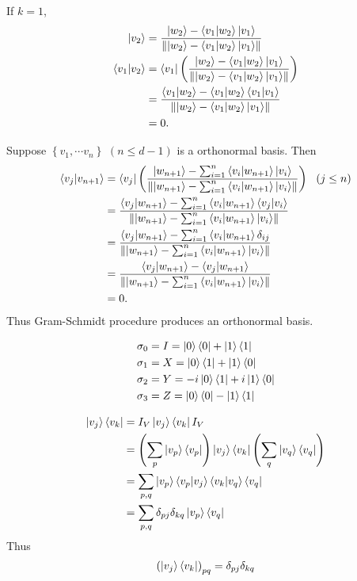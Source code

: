 
If $k = 1$,
\begin{align*}
	\ket{v_2} &= \frac{\ket{w_2} - \braket{v_1 | w_2}\ket{v_1}}{\left\lVert\ket{w_2} - \braket{v_1 | w_2}\ket{v_1}\right\rVert}\\
	\braket{v_1 | v_2} &= \bra{v_1} \left(\frac{\ket{w_2} - \braket{v_1 | w_2}\ket{v_1}}{\left\lVert\ket{w_2} - \braket{v_1 | w_2}\ket{v_1}\right\rVert}\right)\\
		&= \frac{\braket{v_1 | w_2} - \braket{v_1 | w_2}\braket{v_1 | v_1}}{\left\lVert\ket{w_2} - \braket{v_1 | w_2}\ket{v_1}\right\rVert}\\
		&= 0.
\end{align*}

Suppose $\left\{v_1, \cdots v_n \right\}$ $(n \leq d-1)$ is a orthonormal basis. Then
\begin{align*}
	\braket{v_j | v_{n+1}} &= \bra{v_j} \left(\frac{\ket{w_{n+1}} - \sum_{i=1}^{n}\braket{v_i | w_{n+1}}\ket{v_i}}{\left\lVert\ket{w_{n+1}} - \sum_{i=1}^{n}\braket{v_i | w_{n+1}}\ket{v_i}\right\rVert}\right)~~(j \leq n)\\
	&= \frac{\braket{v_j | w_{n+1}} - \sum_{i=1}^{n}\braket{v_i | w_{n+1}}\braket{v_j | v_i}}{\left\lVert\ket{w_{n+1}} - \sum_{i=1}^{n}\braket{v_i | w_{n+1}}\ket{v_i}\right\rVert}\\
	&= \frac{\braket{v_j | w_{n+1}} - \sum_{i=1}^{n}\braket{v_i | w_{n+1}}\delta_{ij}}{\left\lVert\ket{w_{n+1}} - \sum_{i=1}^{n}\braket{v_i | w_{n+1}}\ket{v_i}\right\rVert}\\
	&= \frac{\braket{v_j | w_{n+1}} - \braket{v_j | w_{n+1}}}{\left\lVert\ket{w_{n+1}} - \sum_{i=1}^{n}\braket{v_i | w_{n+1}}\ket{v_i}\right\rVert}\\
	&= 0.
\end{align*}
Thus Gram-Schmidt procedure produces an orthonormal basis.


\begin{align*}
	\sigma_0 &= I = \ket{0}\bra{0} + \ket{1}\bra{1}\\
	\sigma_1 &= X = \ket{0}\bra{1} + \ket{1}\bra{0}\\
	\sigma_2 &= Y = -i\ket{0}\bra{1} + i\ket{1}\bra{0}\\
	\sigma_3 &= Z = \ket{0}\bra{0} - \ket{1}\bra{1}
\end{align*}


\begin{align*}
	\ket{v_j}\bra{v_k} &= I_V \ket{v_j} \bra{v_k} I_V\\
	&= \left(\sum_p \ket{v_p}\bra{v_p} \right) \ket{v_j}\bra{v_k} \left(\sum_q \ket{v_q}\bra{v_q} \right)\\
	&= \sum_{p,q} \ket{v_p} \braket{v_p|v_j}
	\braket{v_k | v_q} \bra{v_q}\\
	&= \sum_{p,q} \delta_{pj} \delta_{kq} \ket{v_p} \bra{v_q}
\end{align*}
Thus
\begin{align*}
	\left( \ket{v_j}\bra{v_k} \right)_{pq} = \delta_{pj} \delta_{kq}
\end{align*}



